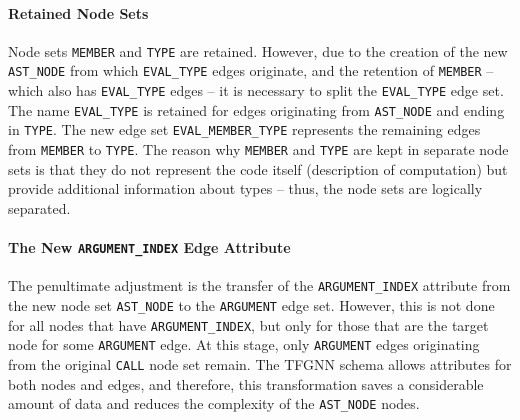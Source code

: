 \paragraph{Retained Node Sets}
Node sets \texttt{MEMBER} and \texttt{TYPE} are retained. However, due to the creation of the new \texttt{AST\_NODE} from which \texttt{EVAL\_TYPE} edges originate, and the retention of \texttt{MEMBER} -- which also has \texttt{EVAL\_TYPE} edges -- it is necessary to split the \texttt{EVAL\_TYPE} edge set. The name \texttt{EVAL\_TYPE} is retained for edges originating from \texttt{AST\_NODE} and ending in \texttt{TYPE}. The new edge set \texttt{EVAL\_MEMBER\_TYPE} represents the remaining edges from \texttt{MEMBER} to \texttt{TYPE}. The reason why \texttt{MEMBER} and \texttt{TYPE} are kept in separate node sets is that they do not represent the code itself (description of computation) but provide additional information about types -- thus, the node sets are logically separated.

\paragraph{The New \texttt{ARGUMENT\_INDEX} Edge Attribute}
The penultimate adjustment is the transfer of the \texttt{ARGUMENT\_INDEX} attribute from the new node set \texttt{AST\_NODE} to the \texttt{ARGUMENT} edge set. However, this is not done for all nodes that have \texttt{ARGUMENT\_INDEX}, but only for those that are the target node for some \texttt{ARGUMENT} edge. At this stage, only \texttt{ARGUMENT} edges originating from the original \texttt{CALL} node set remain. The TFGNN schema allows attributes for both nodes and edges, and therefore, this transformation saves a considerable amount of data and reduces the complexity of the \texttt{AST\_NODE} nodes.

